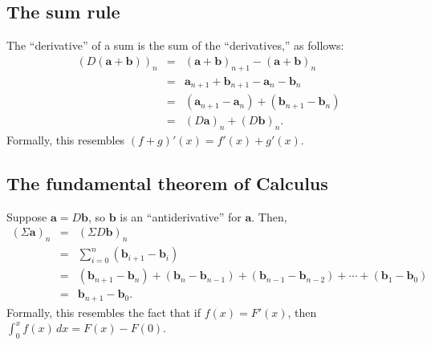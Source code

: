 \documentclass[12pt]{article}
\theoremstyle{definition}
\begin{document}
\subsection*{The sum rule}
The ``derivative'' of a sum is the sum of the ``derivatives,'' as
follows:
\begin{eqnarray*}
\left( D\left(\mathbf{a} + \mathbf{b}\right) \right)_n 
&=& \left(\mathbf{a} + \mathbf{b} \right)_{n+1} - \left(\mathbf{a} + \mathbf{b} \right)_{n} \\
&=& \mathbf{a}_{n+1} + \mathbf{b}_{n+1} - \mathbf{a}_n - \mathbf{b}_n \\
&=& \left( \mathbf{a}_{n+1} - \mathbf{a}_n \right) + \left( \mathbf{b}_{n+1} - \mathbf{b}_n \right) \\
&=& \left(D\mathbf{a}\right)_n + \left(D\mathbf{b}\right)_n.
\end{eqnarray*}
Formally, this resembles $(f + g)'(x) = f'(x) + g'(x)$.

\subsection*{The fundamental theorem of Calculus}

Suppose $\mathbf{a} = D\mathbf{b}$, so $\mathbf{b}$ is an
``antiderivative'' for $\mathbf{a}$.  Then,
\begin{eqnarray*}
\left(\Sigma \mathbf{a}\right)_n &=& \left(\Sigma D\mathbf{b}\right)_n \\
&=& \sum_{i=0}^n \left( \mathbf{b}_{i+1} - \mathbf{b}_i \right) \\
&=& \left( \mathbf{b}_{n+1} - \mathbf{b}_n \right) + 
 \left( \mathbf{b}_{n} - \mathbf{b}_{n-1} \right) + 
 \left( \mathbf{b}_{n-1} - \mathbf{b}_{n-2} \right) + \cdots +
 \left( \mathbf{b}_{1} - \mathbf{b}_{0} \right) \\
&=& \mathbf{b}_{n+1} - \mathbf{b}_0.
\end{eqnarray*}
Formally, this resembles the fact that if $f(x) = F'(x)$, then
$\displaystyle\int_0^x f(x)\, dx = F(x) - F(0)$.
\end{document}
